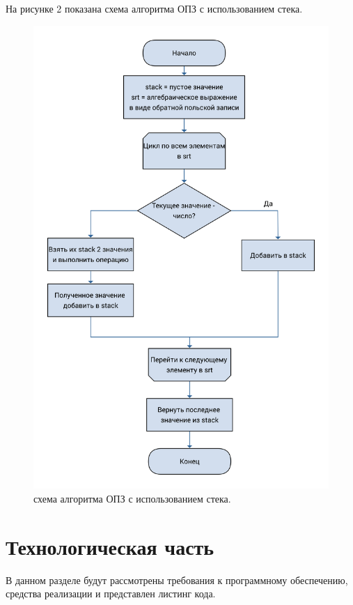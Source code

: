 \documentclass[a4paper, 12pt]{article}
\begin{document}
\clearpage
\newpage
\hspace*{5mm} На рисунке 2 показана схема алгоритма ОПЗ с использованием стека. 
\begin{figure}[h!]
	\centering \includegraphics[scale=0.060]{2}
	\centering\caption{схема алгоритма ОПЗ с использованием стека.}
\end{figure}
\clearpage
\newpage

\section{Технологическая часть}
	\hspace*{5mm} В данном разделе будут рассмотрены требования к программному обеспечению, средства реализации и представлен листинг кода.
\end{document}
